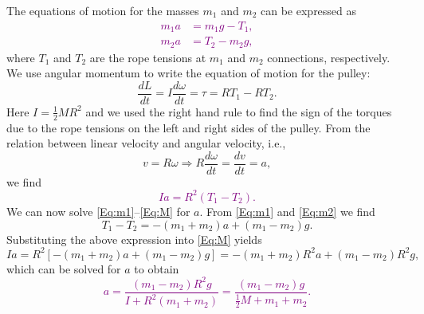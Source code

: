 \documentclass[12pt]{article}
\begin{document}
\begin{ex}
\begin{figure}[!h]
\begin{center}
\begin{tikzpicture}
    
\end{tikzpicture}
\end{center}
\end{figure}

\begin{solution}
  The equations of motion for the masses $m_1$ and $m_2$ can be expressed as\textcolor{purple}{
  \begin{align}
    m_1a&=m_1g-T_1,\label{Eq:m1}\\
    m_2a&=T_2-m_2g,\label{Eq:m2}
  \end{align}}%
  where $T_1$ and $T_2$ are the rope tensions at $m_1$ and $m_2$ connections, respectively. We use angular momentum to write the equation of motion for the pulley:
  $$\frac{dL}{dt}=I\frac{d\omega}{dt}=\tau=RT_1-RT_2.$$
  Here $I=\tfrac{1}{2}MR^2$ and we used the right hand rule to find the sign of the torques due to the rope tensions on the left and right sides of the pulley. From the relation between linear velocity and angular velocity, i.e.,
  $$v=R\omega\Rightarrow R\frac{d\omega}{dt}=\frac{dv}{dt}=a,$$
  we find\textcolor{purple}{
  \begin{equation}
    Ia=R^2(T_1-T_2).
    \label{Eq:M}
  \end{equation}}%
  We can now solve \eqref{Eq:m1}--\eqref{Eq:M} for $a$. From \eqref{Eq:m1} and \eqref{Eq:m2} we find
  $$T_1-T_2=-(m_1+m_2)a+(m_1-m_2)g.$$
  Substituting the above expression into \eqref{Eq:M} yields
  $$Ia=R^2\left[-(m_1+m_2)a+(m_1-m_2)g\right]=-(m_1+m_2)R^2a+(m_1-m_2)R^2g,$$
  which can be solved for $a$ to obtain\textcolor{purple}{
  $$a=\frac{(m_1-m_2)R^2g}{I+R^2(m_1+m_2)}=\frac{(m_1-m_2)g}{\tfrac{1}{2}M+m_1+m_2}.$$}%
\end{solution}

\end{ex}
\end{document}
